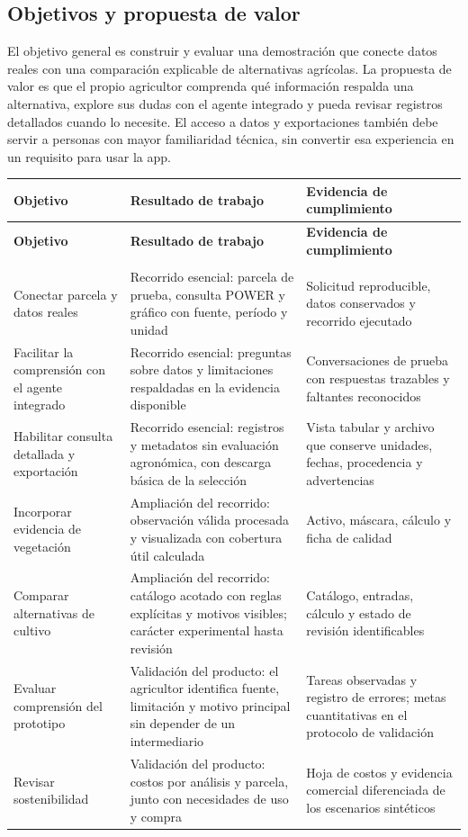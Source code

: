 \documentclass[10pt,a4paper]{article}
\begin{document}
\subsection{Objetivos y propuesta de valor}

El objetivo general es construir y evaluar una demostración que conecte datos reales con una comparación explicable de alternativas agrícolas. La propuesta de valor es que el propio agricultor comprenda qué información respalda una alternativa, explore sus dudas con el agente integrado y pueda revisar registros detallados cuando lo necesite. El acceso a datos y exportaciones también debe servir a personas con mayor familiaridad técnica, sin convertir esa experiencia en un requisito para usar la app.


\begingroup\small
\begin{longtable}{>{\raggedright\arraybackslash}p{3.647cm}>{\raggedright\arraybackslash}p{5.867cm}>{\raggedright\arraybackslash}p{6.343cm}}
\toprule
\textbf{Objetivo} & \textbf{Resultado de trabajo} & \textbf{Evidencia de cumplimiento} \\
\midrule\endfirsthead
\toprule
\textbf{Objetivo} & \textbf{Resultado de trabajo} & \textbf{Evidencia de cumplimiento} \\
\midrule\endhead
\midrule\multicolumn{3}{r}{\scriptsize Continúa en la página siguiente}\\\endfoot
\bottomrule\endlastfoot
Conectar parcela y datos reales & Recorrido esencial: parcela de prueba, consulta POWER y gráfico con fuente, período y unidad & Solicitud reproducible, datos conservados y recorrido ejecutado \\[3pt]
Facilitar la comprensión con el agente integrado & Recorrido esencial: preguntas sobre datos y limitaciones respaldadas en la evidencia disponible & Conversaciones de prueba con respuestas trazables y faltantes reconocidos \\[3pt]
Habilitar consulta detallada y exportación & Recorrido esencial: registros y metadatos sin evaluación agronómica, con descarga básica de la selección & Vista tabular y archivo que conserve unidades, fechas, procedencia y advertencias \\[3pt]
Incorporar evidencia de vegetación & Ampliación del recorrido: observación válida procesada y visualizada con cobertura útil calculada & Activo, máscara, cálculo y ficha de calidad \\[3pt]
Comparar alternativas de cultivo & Ampliación del recorrido: catálogo acotado con reglas explícitas y motivos visibles; carácter experimental hasta revisión & Catálogo, entradas, cálculo y estado de revisión identificables \\[3pt]
Evaluar comprensión del prototipo & Validación del producto: el agricultor identifica fuente, limitación y motivo principal sin depender de un intermediario & Tareas observadas y registro de errores; metas cuantitativas en el protocolo de validación \\[3pt]
Revisar sostenibilidad & Validación del producto: costos por análisis y parcela, junto con necesidades de uso y compra & Hoja de costos y evidencia comercial diferenciada de los escenarios sintéticos \\[3pt]
\end{longtable}
\endgroup
\end{document}
